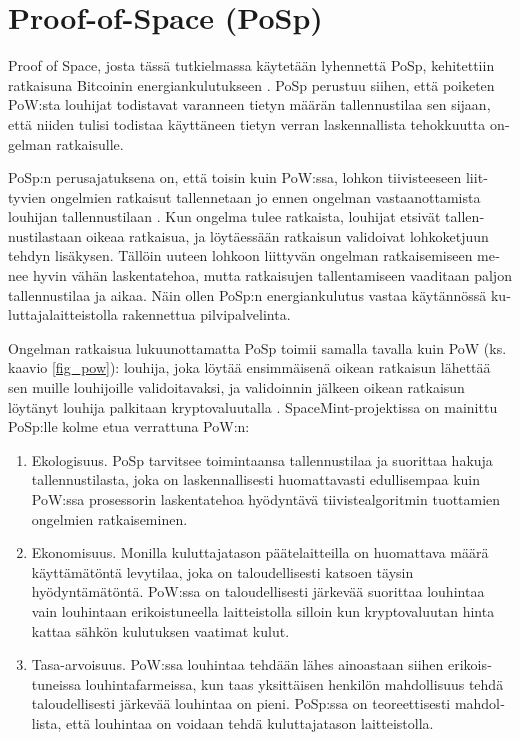 \section{Proof-of-Space (PoSp)\label{posp}}
\begin{otherlanguage}{english}
Proof of Space, josta tässä tutkielmassa käytetään lyhennettä PoSp, kehitettiin ratkaisuna Bitcoinin energiankulutukseen \cite{pospchia1,posp2}. PoSp perustuu siihen, että poiketen PoW:sta louhijat todistavat varanneen tietyn määrän tallennustilaa sen sijaan, että niiden tulisi todistaa käyttäneen tietyn verran laskennallista tehokkuutta ongelman ratkaisulle.

PoSp:n perusajatuksena on, että toisin kuin PoW:ssa, lohkon tiivisteeseen liittyvien ongelmien ratkaisut tallennetaan jo ennen ongelman vastaanottamista louhijan tallennustilaan \cite{posp3spacemint}. Kun ongelma tulee ratkaista, louhijat etsivät tallennustilastaan oikeaa ratkaisua, ja löytäessään ratkaisun validoivat lohkoketjuun tehdyn lisäkysen. Tällöin uuteen lohkoon liittyvän ongelman ratkaisemiseen menee hyvin vähän laskentatehoa, mutta ratkaisujen tallentamiseen vaaditaan paljon tallennustilaa ja aikaa. Näin ollen PoSp:n energiankulutus vastaa käytännössä kuluttajalaitteistolla rakennettua pilvipalvelinta.

Ongelman ratkaisua lukuunottamatta PoSp toimii samalla tavalla kuin PoW (ks. kaavio \ref{fig_pow}): louhija, joka löytää ensimmäisenä oikean ratkaisun lähettää sen muille louhijoille validoitavaksi, ja validoinnin jälkeen oikean ratkaisun löytänyt louhija palkitaan kryptovaluutalla \cite{posp3spacemint}. SpaceMint-projektissa on mainittu PoSp:lle kolme etua verrattuna PoW:n:

\begin{enumerate}
\item Ekologisuus. PoSp tarvitsee toimintaansa tallennustilaa ja suorittaa hakuja tallennustilasta, joka on laskennallisesti huomattavasti edullisempaa kuin PoW:ssa prosessorin laskentatehoa hyödyntävä tiivistealgoritmin tuottamien ongelmien ratkaiseminen.
\item Ekonomisuus. Monilla kuluttajatason päätelaitteilla on huomattava määrä käyttämätöntä levytilaa, joka on taloudellisesti katsoen täysin hyödyntämätöntä. PoW:ssa on taloudellisesti järkevää suorittaa louhintaa vain louhintaan erikoistuneella laitteistolla silloin kun kryptovaluutan hinta kattaa sähkön kulutuksen vaatimat kulut.
\item Tasa-arvoisuus. PoW:ssa louhintaa tehdään lähes ainoastaan siihen erikoistuneissa louhintafarmeissa, kun taas yksittäisen henkilön mahdollisuus tehdä taloudellisesti järkevää louhintaa on pieni. PoSp:ssa on teoreettisesti mahdollista, että louhintaa on voidaan tehdä kuluttajatason laitteistolla.
\end{enumerate}


\end{otherlanguage}
